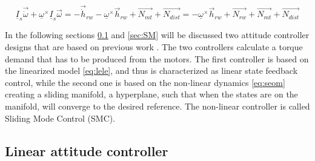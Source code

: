 		\begin{equation}
		\underline{I}_{s}\vec{\dot{\omega}} + \underline{\omega}^\times\underline{I}_{s}\vec{\omega} = -\vec{\dot{h}}_{rw} -  \underline{\omega}^\times \vec{{h}}_{rw} + \vec{N_{mt}}  + \vec{N_{dist}} =  -  \underline{\omega}^\times \vec{{h}}_{rw} + \vec{N_{rw}} + \vec{N_{mt}}  + \vec{N_{dist}} 
		\end{equation}
		





In the following sections \ref{sec:LC} and \ref{sec:SM}  will be discussed two attitude controller designs that are based on previous work \cite{PrevPro}. The two controllers calculate a torque demand that has to be produced from the motors. The first controller is based on the linearized model \eqref{eq:lele}, and thus is characterized as linear state feedback control, while the second one is based on the non-linear dynamics \eqref{eq:seom} creating a sliding manifold, a hyperplane, such that when the states are on the manifold, will converge to the desired reference. The non-linear controller is called Sliding Mode Control (SMC).

\subsection{Linear attitude controller} \label{sec:LC}

